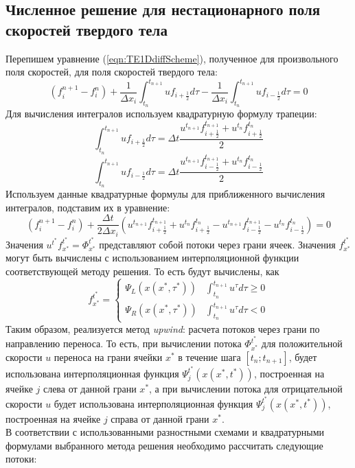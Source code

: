 \documentclass[10pt,a4paper]{article}
\begin{document}
\subsection{Численное решение для нестационарного поля скоростей твердого тела}
Перепишем уравнение (\ref{eqn:TE1DdiffScheme}), полученное для произвольного поля скоростей, для поля скоростей твердого тела:
\[
(f_i^{n+1}-f_i^n)
+
\frac{1}{\Delta x_i}
\int_{t_n}^{t_{n+1}}
{u}f_{i+\frac{1}{2}}d\tau
-
\frac{1}{\Delta x_i}
\int_{t_n}^{t_{n+1}}
{u}f_{i-\frac{1}{2}}d\tau
=0
\]
Для вычисления интегралов используем квадратурную формулу трапеции:
\[
\int_{t_n}^{t_{n+1}}{u}f_{i+\frac{1}{2}}d\tau =
\Delta t \frac{
u^{t_{n+1}}f_{i+\frac{1}{2}}^{t_{n+1}} +
u^{t_{n}}f_{i+\frac{1}{2}}^{t_{n}}
}{2}
\]
\[
\int_{t_n}^{t_{n+1}}{u}f_{i-\frac{1}{2}}d\tau =
\Delta t \frac{
u^{t_{n+1}}f_{i-\frac{1}{2}}^{t_{n+1}} +
u^{t_{n}}f_{i-\frac{1}{2}}^{t_{n}}
}{2}
\]
Используем данные квадратурные формулы для приближенного вычисления интегралов, подставим их в уравнение:
\begin{equation}
\label{eqn:TERB1D}
(f_i^{n+1}-f_i^n)
+
\frac{\Delta t}{2\Delta x_i} (
u^{t_{n+1}}f_{i+\frac{1}{2}}^{t_{n+1}}
+ u^{t_{n}}f_{i+\frac{1}{2}}^{t_{n}}
- u^{t_{n+1}}f_{i-\frac{1}{2}}^{t_{n+1}}
- u^{t_{n}}f_{i-\frac{1}{2}}^{t_{n}}
)=0
\end{equation}
Значения $u^{t^*}f_{x^*}^{t^*}=\Phi_{x^*}^{t^*}$ представляют собой потоки через грани ячеек. Значения $f_{x^*}^{t^*}$ могут быть вычислены с использованием интерполяционной функции соответствующей методу решения. То есть будут вычислены, как
\begin{equation}
\label{eqn:PsyIntrpolationFunc}
f_{x^*}^{t^*} = \begin{cases}
\Psi_{L}(x(x^*,\tau^*))
& \int_{t_n}^{t_{n+1}} u^{\tau}d\tau\geq0
\\
\Psi_{R}(x(x^*,\tau^*))
& \int_{t_n}^{t_{n+1}} u^{\tau}d\tau < 0
\end{cases}
\end{equation}
Таким образом, реализуется метод \textit{upwind}: расчета потоков через грани по направлению переноса.
То есть, при вычислении потока $\Phi_{x^*}^{t^*}$ для положительной скорости $u$ переноса на грани ячейки $x^*$ в течение шага $[t_n; t_{n+1}]$, будет использована интерполяционная функция $\Psi_{j}^{t^*}(x(x^*,t^*))$, построенная на ячейке $j$ слева от данной грани $x^*$, а при вычислении потока для отрицательной скорости $u$ будет использована интерполяционная функция $\Psi_{j}^{t^*}(x(x^*,t^*))$, построенная на ячейке $j$ справа от данной грани $x^*$.
\\В соответствии с использованными разностными схемами и квадратурными формулами выбранного метода решения необходимо рассчитать следующие потоки:
\end{document}
